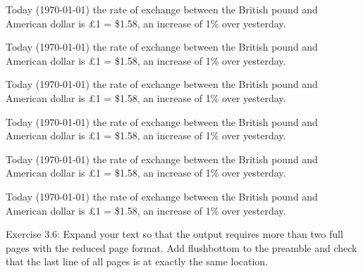 \documentclass{article}
\begin{document}
Today (\today) the rate of exchange between the British
pound and American dollar is \pounds 1 = \$1.58, an
increase of 1\% over yesterday.

Today (\today) the rate of exchange between the British
pound and American dollar is \pounds 1 = \$1.58, an
increase of 1\% over yesterday.

Today (\today) the rate of exchange between the British
pound and American dollar is \pounds 1 = \$1.58, an
increase of 1\% over yesterday.

Today (\today) the rate of exchange between the British
pound and American dollar is \pounds 1 = \$1.58, an
increase of 1\% over yesterday.

Today (\today) the rate of exchange between the British
pound and American dollar is \pounds 1 = \$1.58, an
increase of 1\% over yesterday.

Today (\today) the rate of exchange between the British
pound and American dollar is \pounds 1 = \$1.58, an
increase of 1\% over yesterday.

Exercise 3.6: Expand your text so that the output requires more than two
full pages with the reduced page format. Add flushbottom to the preamble
and check that the last line of all pages is at exactly the same
location.


\layout
\end{document}
